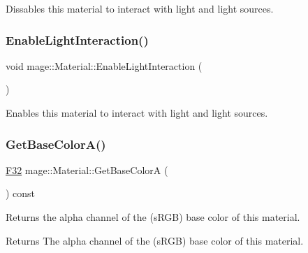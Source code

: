 Dissables this material to interact with light and light sources. \hypertarget{structmage_1_1_material_abbcdcc3a9cb44c854212508c8419aa7f}{}\label{structmage_1_1_material_abbcdcc3a9cb44c854212508c8419aa7f} 
\subsubsection{\texorpdfstring{Enable\+Light\+Interaction()}{EnableLightInteraction()}}
{\footnotesize\ttfamily void mage\+::\+Material\+::\+Enable\+Light\+Interaction (\begin{DoxyParamCaption}{ }\end{DoxyParamCaption})\hspace{0.3cm}{\ttfamily [noexcept]}}

Enables this material to interact with light and light sources. \hypertarget{structmage_1_1_material_ad96a20683c2aa0f90d189066567d9cd4}{}\label{structmage_1_1_material_ad96a20683c2aa0f90d189066567d9cd4} 
\subsubsection{\texorpdfstring{Get\+Base\+Color\+A()}{GetBaseColorA()}}
{\footnotesize\ttfamily \hyperlink{namespacemage_aa97e833b45f06d60a0a9c4fc22ae02c0}{F32} mage\+::\+Material\+::\+Get\+Base\+ColorA (\begin{DoxyParamCaption}{ }\end{DoxyParamCaption}) const\hspace{0.3cm}{\ttfamily [noexcept]}}

Returns the alpha channel of the (s\+R\+GB) base color of this material.

\begin{DoxyReturn}{Returns}
The alpha channel of the (s\+R\+GB) base color of this material. 
\end{DoxyReturn}
\hypertarget{structmage_1_1_material_ac24c2c36e2ddcf1802ad44a6c45fb17d}{}\label{structmage_1_1_material_ac24c2c36e2ddcf1802ad44a6c45fb17d} 
